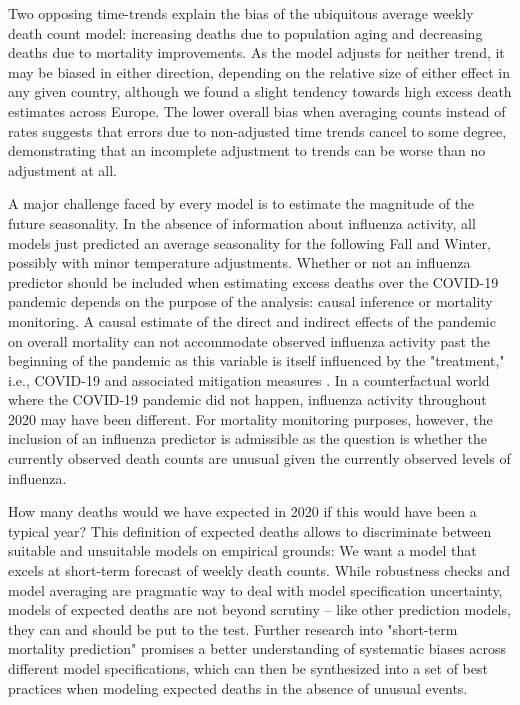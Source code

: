 \documentclass[12pt]{article}
\begin{document}
Two opposing time-trends explain the bias of the ubiquitous average weekly death count model: increasing deaths due to population aging and decreasing deaths due to mortality improvements. As the model adjusts for neither trend, it may be biased in either direction, depending on the relative size of either effect in any given country, although we found a slight tendency towards high excess death estimates across Europe. The lower overall bias when averaging counts instead of rates suggests that errors due to non-adjusted time trends cancel to some degree, demonstrating that an incomplete adjustment to trends can be worse than no adjustment at all.

A major challenge faced by every model is to estimate the magnitude of the future seasonality. In the absence of information about influenza activity, all models just predicted an average seasonality for the following Fall and Winter, possibly with minor temperature adjustments. Whether or not an influenza predictor should be included when estimating excess deaths over the COVID-19 pandemic depends on the purpose of the analysis: causal inference or mortality monitoring. A causal estimate of the direct and indirect effects of the pandemic on overall mortality can not accommodate observed influenza activity past the beginning of the pandemic as this variable is itself influenced by the "treatment," i.e., COVID-19 and associated mitigation measures \cite{Cowling2020, Soo2020}. In a counterfactual world where the COVID-19 pandemic did not happen, influenza activity throughout 2020 may have been different. For mortality monitoring purposes, however, the inclusion of an influenza predictor is admissible as the question is whether the currently observed death counts are unusual given the currently observed levels of influenza.

How many deaths would we have expected in 2020 if this would have been a typical year? This definition of expected deaths allows to discriminate between suitable and unsuitable models on empirical grounds: We want a model that excels at short-term forecast of weekly death counts. While robustness checks and model averaging are pragmatic way to deal with model specification uncertainty, models of expected deaths are not beyond scrutiny -- like other prediction models, they can and should be put to the test. Further research into "short-term mortality prediction" promises a better understanding of systematic biases across different model specifications, which can then be synthesized into a set of best practices when modeling expected deaths in the absence of unusual events.
\end{document}

